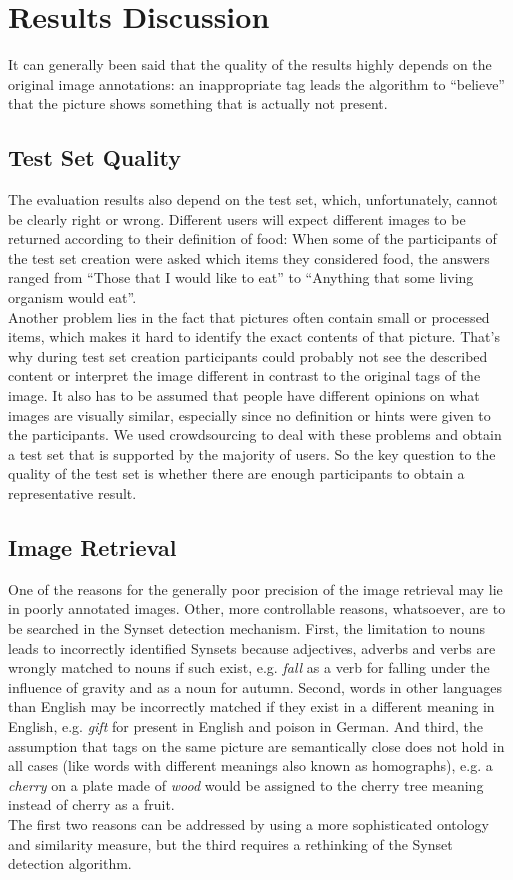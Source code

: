 %
\section{Results Discussion}
\label{sec_discussion}

It can generally been said that the quality of the results highly depends on the original image annotations: an inappropriate tag leads the algorithm to ``believe'' that the picture shows something that is actually not present.

\subsection{Test Set Quality}
The evaluation results also depend on the test set, which, unfortunately, cannot be clearly right or wrong. Different users will expect different images to be returned according to their definition of food: When some of the participants of the test set creation were asked which items they considered food, the answers ranged from ``Those that I would like to eat'' to ``Anything that some living organism would eat''. \\
Another problem lies in the fact that pictures often contain small or processed items, which makes it hard to identify the exact contents of that picture. That's why during test set creation participants could probably not see the described content or interpret the image different in contrast to the original tags of the image.
It also has to be assumed that people have different opinions on what images are visually similar, especially since no definition or hints were given to the participants. We used crowdsourcing to deal with these problems and obtain a test set that is supported by the majority of users. So the key question to the quality of the test set is whether there are enough participants to obtain a representative result.

\subsection{Image Retrieval}
One of the reasons for the generally poor precision of the image retrieval may lie in poorly annotated images.
Other, more controllable reasons, whatsoever, are to be searched in the Synset detection mechanism.
First, the limitation to nouns leads to incorrectly identified Synsets because adjectives, adverbs and verbs are wrongly matched to nouns if such exist, e.g. \emph{fall} as a verb for falling under the influence of gravity and as a noun for autumn.
Second, words in other languages than English may be incorrectly matched if they exist in a different meaning in English, e.g. \emph{gift} for present in English and poison in German.
And third, the assumption that tags on the same picture are semantically close does not hold in all cases (like words with different meanings also known as homographs), e.g. a \emph{cherry} on a plate made of \emph{wood} would be assigned to the cherry tree meaning instead of cherry as a fruit. \\
The first two reasons can be addressed by using a more sophisticated ontology and similarity measure, but the third requires a rethinking of the Synset detection algorithm.

